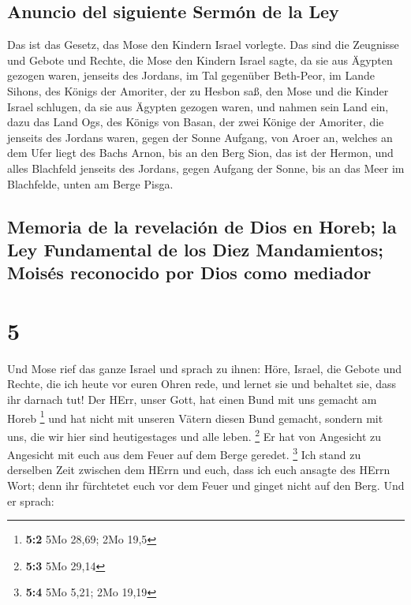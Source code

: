 \hypertarget{anuncio-del-siguiente-sermuxf3n-de-la-ley}{%
\subsection{Anuncio del siguiente Sermón de la
Ley}\label{anuncio-del-siguiente-sermuxf3n-de-la-ley}}

 Das ist das Gesetz, das Mose den Kindern Israel
vorlegte.  Das sind die Zeugnisse und Gebote und Rechte,
die Mose den Kindern Israel sagte, da sie aus Ägypten gezogen waren,
 jenseits des Jordans, im Tal gegenüber Beth-Peor, im
Lande Sihons, des Königs der Amoriter, der zu Hesbon saß, den Mose und
die Kinder Israel schlugen, da sie aus Ägypten gezogen waren,
 und nahmen sein Land ein, dazu das Land Ogs, des Königs
von Basan, der zwei Könige der Amoriter, die jenseits des Jordans waren,
gegen der Sonne Aufgang,  von Aroer an, welches an dem
Ufer liegt des Bachs Arnon, bis an den Berg Sion, das ist der Hermon,
 und alles Blachfeld jenseits des Jordans, gegen Aufgang
der Sonne, bis an das Meer im Blachfelde, unten am Berge Pisga.

\hypertarget{memoria-de-la-revelaciuxf3n-de-dios-en-horeb-la-ley-fundamental-de-los-diez-mandamientos-moisuxe9s-reconocido-por-dios-como-mediador}{%
\subsection{Memoria de la revelación de Dios en Horeb; la Ley
Fundamental de los Diez Mandamientos; Moisés reconocido por Dios como
mediador}\label{memoria-de-la-revelaciuxf3n-de-dios-en-horeb-la-ley-fundamental-de-los-diez-mandamientos-moisuxe9s-reconocido-por-dios-como-mediador}}

\hypertarget{section-4}{%
\section{5}\label{section-4}}

 Und Mose rief das ganze Israel und sprach zu ihnen: Höre,
Israel, die Gebote und Rechte, die ich heute vor euren Ohren rede, und
lernet sie und behaltet sie, dass ihr darnach tut!  Der
HErr, unser Gott, hat einen Bund mit uns gemacht am Horeb \footnote{\textbf{5:2}
  5Mo 28,69; 2Mo 19,5}  und hat nicht mit unseren Vätern
diesen Bund gemacht, sondern mit uns, die wir hier sind heutigestages
und alle leben. \footnote{\textbf{5:3} 5Mo 29,14}  Er hat
von Angesicht zu Angesicht mit euch aus dem Feuer auf dem Berge geredet.
\footnote{\textbf{5:4} 5Mo 5,21; 2Mo 19,19}  Ich stand zu
derselben Zeit zwischen dem HErrn und euch, dass ich euch ansagte des
HErrn Wort; denn ihr fürchtetet euch vor dem Feuer und ginget nicht auf
den Berg. Und er sprach:

